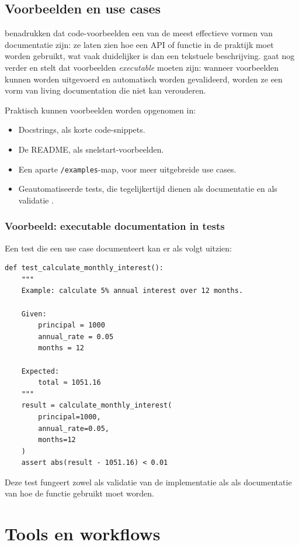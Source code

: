 \subsection{Voorbeelden en use cases}
\textcite{bhatti2021docsdevelopers} benadrukken dat code-voorbeelden een van de meest effectieve vormen van documentatie zijn: ze laten zien hoe een API of functie in de praktijk moet worden gebruikt, wat vaak duidelijker is dan een tekstuele beschrijving. \textcite{martraire2019livingdocumentation} gaat nog verder en stelt dat voorbeelden \textit{executable} moeten zijn: wanneer voorbeelden kunnen worden uitgevoerd en automatisch worden gevalideerd, worden ze een vorm van living documentation die niet kan verouderen.

Praktisch kunnen voorbeelden worden opgenomen in:
\begin{itemize}
    \item Docstrings, als korte code-snippets.
    \item De README, als snelstart-voorbeelden.
    \item Een aparte \texttt{/examples}-map, voor meer uitgebreide use cases.
    \item Geautomatiseerde tests, die tegelijkertijd dienen als documentatie en als validatie \autocite{martraire2019livingdocumentation}.
\end{itemize}

\subsubsection{Voorbeeld: executable documentation in tests}
Een test die een use case documenteert kan er als volgt uitzien:

\begin{verbatim}
def test_calculate_monthly_interest():
    """
    Example: calculate 5% annual interest over 12 months.

    Given:
        principal = 1000
        annual_rate = 0.05
        months = 12

    Expected:
        total ≈ 1051.16
    """
    result = calculate_monthly_interest(
        principal=1000,
        annual_rate=0.05,
        months=12
    )
    assert abs(result - 1051.16) < 0.01
\end{verbatim}

Deze test fungeert zowel als validatie van de implementatie als als documentatie van hoe de functie gebruikt moet worden.


\section{Tools en workflows}
\label{sec:cad-tools}

